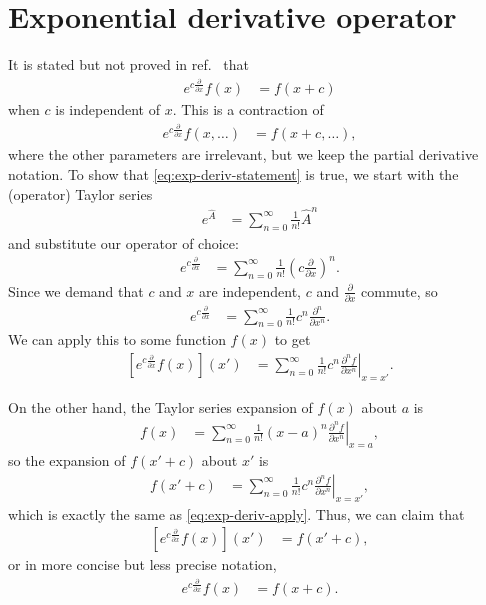 \section{Exponential derivative operator}

It is stated but not proved in ref.~\cite{tuckerman1992reversible} that
\begin{align}
	e^{c \frac{\partial}{\partial x}} f(x)
	&= f(x + c)
		\label{eq:exp-deriv-statement}
\end{align}
when $c$ is independent of $x$.
This is a contraction of
\begin{align}
	e^{c \frac{\partial}{\partial x}} f(x, \ldots)
	&= f(x + c, \ldots),
\end{align}
where the other parameters are irrelevant, but we keep the partial derivative notation.
To show that \cref{eq:exp-deriv-statement} is true, we start with the (operator) Taylor series~\cite[48]{sakurai1985modern}
\begin{align}
	e^{\hat{A}}
	&= \sum_{n=0}^\infty \frac{1}{n!} \hat{A}^n
\end{align}
and substitute our operator of choice:
\begin{align}
	e^{c \frac{\partial}{\partial x}}
	&= \sum_{n=0}^\infty \frac{1}{n!} \left( c \frac{\partial}{\partial x} \right)^n.
\end{align}
Since we demand that $c$ and $x$ are independent, $c$ and $\frac{\partial}{\partial x}$ commute, so
\begin{align}
	e^{c \frac{\partial}{\partial x}}
	&= \sum_{n=0}^\infty \frac{1}{n!} c^n \frac{\partial^n}{\partial x^n}.
\end{align}
We can apply this to some function $f(x)$ to get
\begin{align}
	\left[ e^{c \frac{\partial}{\partial x}} f(x) \right] (x')
	&= \sum_{n=0}^\infty \frac{1}{n!} c^n \left. \frac{\partial^n f}{\partial x^n} \right|_{x=x'}.
		\label{eq:exp-deriv-apply}
\end{align}

On the other hand, the Taylor series expansion of $f(x)$ about $a$ is~\cite[735]{stewart2008calculus}
\begin{align}
	f(x)
	&= \sum_{n=0}^\infty \frac{1}{n!} (x-a)^n \left. \frac{\partial^n f}{\partial x^n} \right|_{x=a},
\end{align}
so the expansion of $f(x' + c)$ about $x'$ is
\begin{align}
	f(x' + c)
	&= \sum_{n=0}^\infty \frac{1}{n!} c^n \left. \frac{\partial^n f}{\partial x^n} \right|_{x=x'},
\end{align}
which is exactly the same as \cref{eq:exp-deriv-apply}.
Thus, we can claim that
\begin{align}
	\left[ e^{c \frac{\partial}{\partial x}} f(x) \right] (x')
	&= f(x' + c),
\end{align}
or in more concise but less precise notation,
\begin{align}
	e^{c \frac{\partial}{\partial x}} f(x)
	&= f(x + c).
\end{align}

